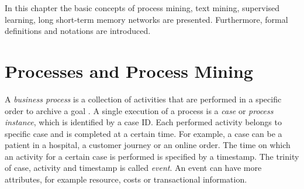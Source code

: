 In this chapter the basic concepts of process mining, text mining, supervised learning, long short-term memory networks are presented. Furthermore, formal definitions and notations are introduced.




\section{Processes and Process Mining}

A \textit{business process} is a collection of activities that are performed in a specific order to archive a goal \cite{DBLP:conf/bpm/AalstAM11}.
A single execution of a process is a \textit{case} or \textit{process instance}, which is identified by a case ID.
Each performed activity belongs to specific case and is completed at a certain time.
For example, a case can be a patient in a hospital, a customer journey or an online order. The time on which an activity for a certain case is performed is specified by a timestamp.
The trinity of case, activity and timestamp is called \textit{event}.
An event can have more attributes, for example resource, costs or transactional information.

